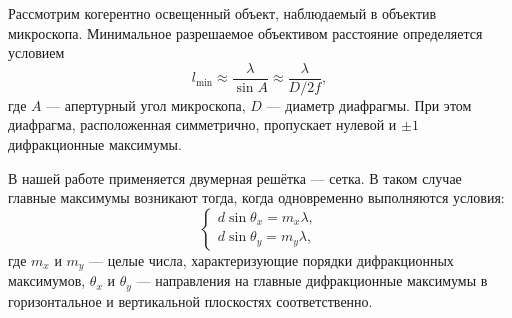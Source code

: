 \documentclass[a4paper, 12pt]{article}
\begin{document}
	Рассмотрим когерентно освещенный объект, наблюдаемый в объектив микроскопа. Минимальное разрешаемое объективом расстояние определяется условием
	\begin{equation}
		\label{min}
		l_{\text{min}} \approx \frac{\lambda}{\sin A} \approx \frac{\lambda}{D/2f},
	\end{equation}
	где $A$ --- апертурный угол микроскопа, $D$ --- диаметр диафрагмы. При этом диафрагма, расположенная симметрично, пропускает нулевой и $\pm 1$ дифракционные максимумы.
	
	В нашей работе применяется двумерная решётка --- сетка. В таком случае главные максимумы возникают тогда, когда одновременно выполняются условия:
	\begin{equation}
		\label{system}
		\begin{cases}
			d \sin \theta_x = m_x \lambda, \\
			d \sin \theta_y = m_y \lambda,
		\end{cases}
	\end{equation}
	где $m_x$ и $m_y$ --- целые числа, характеризующие порядки дифракционных максимумов, $\theta_x$ и $\theta_y$ --- направления на главные дифракционные максимумы в горизонтальное и вертикальной плоскостях соответственно.
	
\end{document}

